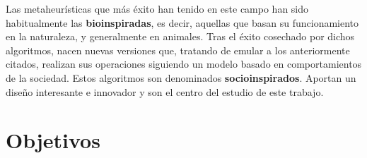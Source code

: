 Las metaheurísticas que más éxito han tenido en este campo han sido habitualmente las \textbf{bioinspiradas}, es decir, aquellas que basan su funcionamiento en la naturaleza, y generalmente en animales. Tras el éxito cosechado por dichos algoritmos, nacen nuevas versiones que, tratando de emular a los anteriormente citados, realizan sus operaciones siguiendo un modelo basado en comportamientos de la sociedad. Estos algoritmos son denominados \textbf{socioinspirados}. Aportan un diseño interesante e innovador y son el centro del estudio de este trabajo.

\section{Objetivos}


